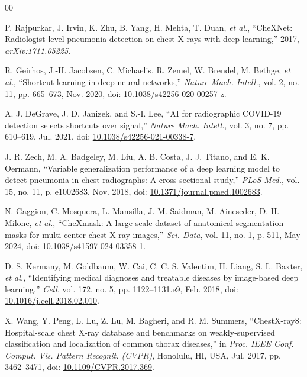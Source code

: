 \documentclass[journal,twoside,web]{ieeecolor}
\begin{document}
\begin{thebibliography}{00}

P. Rajpurkar, J. Irvin, K. Zhu, B. Yang, H. Mehta, T. Duan, \textit{et al.}, ``CheXNet: Radiologist-level pneumonia detection on chest X-rays with deep learning,'' 2017, \textit{arXiv:1711.05225}.

R. Geirhos, J.-H. Jacobsen, C. Michaelis, R. Zemel, W. Brendel, M. Bethge, \textit{et al.}, ``Shortcut learning in deep neural networks,'' \textit{Nature Mach. Intell.}, vol. 2, no. 11, pp. 665--673, Nov. 2020, doi: \href{https://doi.org/10.1038/s42256-020-00257-z}{10.1038/s42256-020-00257-z}.

A. J. DeGrave, J. D. Janizek, and S.-I. Lee, ``AI for radiographic COVID-19 detection selects shortcuts over signal,'' \textit{Nature Mach. Intell.}, vol. 3, no. 7, pp. 610--619, Jul. 2021, doi: \href{https://doi.org/10.1038/s42256-021-00338-7}{10.1038/s42256-021-00338-7}.

J. R. Zech, M. A. Badgeley, M. Liu, A. B. Costa, J. J. Titano, and E. K. Oermann, ``Variable generalization performance of a deep learning model to detect pneumonia in chest radiographs: A cross-sectional study,'' \textit{PLoS Med.}, vol. 15, no. 11, p. e1002683, Nov. 2018, doi: \href{https://doi.org/10.1371/journal.pmed.1002683}{10.1371/journal.pmed.1002683}.

N. Gaggion, C. Mosquera, L. Mansilla, J. M. Saidman, M. Aineseder, D. H. Milone, \textit{et al.}, ``CheXmask: A large-scale dataset of anatomical segmentation masks for multi-center chest X-ray images,'' \textit{Sci. Data}, vol. 11, no. 1, p. 511, May 2024, doi: \href{https://doi.org/10.1038/s41597-024-03358-1}{10.1038/s41597-024-03358-1}.

D. S. Kermany, M. Goldbaum, W. Cai, C. C. S. Valentim, H. Liang, S. L. Baxter, \textit{et al.}, ``Identifying medical diagnoses and treatable diseases by image-based deep learning,'' \textit{Cell}, vol. 172, no. 5, pp. 1122--1131.e9, Feb. 2018, doi: \href{https://doi.org/10.1016/j.cell.2018.02.010}{10.1016/j.cell.2018.02.010}.

X. Wang, Y. Peng, L. Lu, Z. Lu, M. Bagheri, and R. M. Summers, ``ChestX-ray8: Hospital-scale chest X-ray database and benchmarks on weakly-supervised classification and localization of common thorax diseases,'' in \textit{Proc. IEEE Conf. Comput. Vis. Pattern Recognit. (CVPR)}, Honolulu, HI, USA, Jul. 2017, pp. 3462--3471, doi: \href{https://doi.org/10.1109/CVPR.2017.369}{10.1109/CVPR.2017.369}.


\end{thebibliography}
\end{document}

